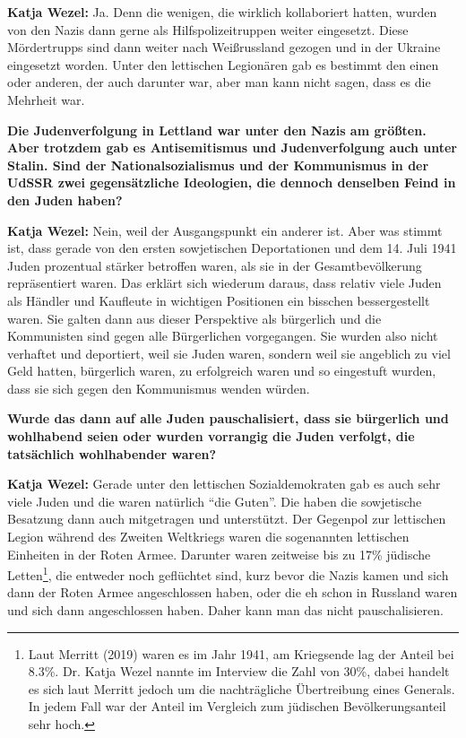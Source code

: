 \textbf{Katja Wezel:} Ja. Denn die wenigen, die wirklich kollaboriert hatten, wurden von den Nazis dann gerne als Hilfspolizeitruppen weiter eingesetzt. Diese Mördertrupps sind dann weiter nach Weißrussland gezogen und in der Ukraine eingesetzt worden. Unter den lettischen Legionären gab es bestimmt den einen oder anderen, der auch darunter war, aber man kann nicht sagen, dass es die Mehrheit war.

\textbf{Die Judenverfolgung in Lettland war unter den Nazis am größten. Aber trotzdem gab es Antisemitismus und Judenverfolgung auch unter Stalin. Sind der Nationalsozialismus und der Kommunismus in der UdSSR zwei gegensätzliche Ideologien, die dennoch denselben Feind in den Juden haben?}

\textbf{Katja Wezel:} Nein, weil der Ausgangspunkt ein anderer ist. Aber was stimmt ist, dass gerade von den ersten sowjetischen Deportationen und dem 14. Juli 1941 Juden prozentual stärker betroffen waren, als sie in der Gesamtbevölkerung repräsentiert waren. Das erklärt sich wiederum daraus, dass relativ viele Juden als Händler und Kaufleute in wichtigen Positionen ein bisschen bessergestellt waren. Sie galten dann aus dieser Perspektive als bürgerlich und die Kommunisten sind gegen alle Bürgerlichen vorgegangen. Sie wurden also nicht verhaftet und deportiert, weil sie Juden waren, sondern weil sie angeblich zu viel Geld hatten, bürgerlich waren, zu erfolgreich waren und so eingestuft wurden, dass sie sich gegen den Kommunismus wenden würden. 

\textbf{Wurde das dann auf alle Juden pauschalisiert, dass sie bürgerlich und wohlhabend seien oder wurden vorrangig die Juden verfolgt, die tatsächlich wohlhabender waren?} 

\textbf{Katja Wezel:} Gerade unter den lettischen Sozialdemokraten gab es auch sehr viele Juden und die waren natürlich “die Guten”. Die haben die sowjetische Besatzung dann auch mitgetragen und unterstützt. Der Gegenpol zur lettischen Legion während des Zweiten Weltkriegs waren die sogenannten lettischen Einheiten in der Roten Armee. Darunter waren zeitweise bis zu 17\% jüdische Letten\footnote{Laut Merritt (2019) waren es im Jahr 1941, am Kriegsende lag der Anteil bei 8.3\%. Dr. Katja Wezel nannte im Interview die Zahl von 30\%, dabei handelt es sich laut Merritt jedoch um die nachträgliche Übertreibung eines Generals. In jedem Fall war der Anteil  im Vergleich zum jüdischen Bevölkerungsanteil sehr hoch.}, die entweder noch geflüchtet sind, kurz bevor die Nazis kamen und sich dann der Roten Armee angeschlossen haben, oder die eh schon in Russland waren und sich dann angeschlossen haben. Daher kann man das nicht pauschalisieren. 


